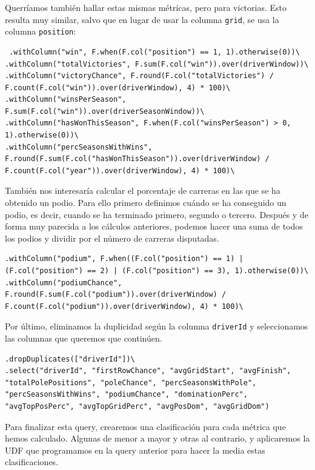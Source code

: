 \documentclass[12pt,twoside,titlepage]{report}
\begin{document}
Querríamos también hallar estas mismas métricas, pero para victorias. Esto resulta muy similar, salvo que en lugar de usar la columna \texttt{grid}, se usa la columna \texttt{position}:

\begin{lstlisting}
 .withColumn("win", F.when(F.col("position") == 1, 1).otherwise(0))\
.withColumn("totalVictories", F.sum(F.col("win")).over(driverWindow))\
.withColumn("victoryChance", F.round(F.col("totalVictories") / F.count(F.col("win")).over(driverWindow), 4) * 100)\
.withColumn("winsPerSeason", F.sum(F.col("win")).over(driverSeasonWindow))\
.withColumn("hasWonThisSeason", F.when(F.col("winsPerSeason") > 0, 1).otherwise(0))\
.withColumn("percSeasonsWithWins", F.round(F.sum(F.col("hasWonThisSeason")).over(driverWindow) / F.count(F.col("year")).over(driverWindow), 4) * 100)\
\end{lstlisting}

También nos interesaría calcular el porcentaje de carreras en las que se ha obtenido un podio. Para ello primero definimos cuándo se ha conseguido un podio, es decir, cuando se ha terminado primero, segundo o tercero. Después y de forma muy parecida a los cálculos anteriores, podemos hacer una suma de todos los podios y dividir por el número de carreras disputadas.

\begin{lstlisting}
.withColumn("podium", F.when((F.col("position") == 1) | (F.col("position") == 2) | (F.col("position") == 3), 1).otherwise(0))\
.withColumn("podiumChance", F.round(F.sum(F.col("podium")).over(driverWindow) / F.count(F.col("podium")).over(driverWindow), 4) * 100)\
\end{lstlisting}

Por último, eliminamos la duplicidad según la columna \texttt{driverId} y seleccionamos las columnas que queremos que continúen.

\begin{lstlisting}
.dropDuplicates(["driverId"])\
.select("driverId", "firstRowChance", "avgGridStart", "avgFinish", 
"totalPolePositions", "poleChance", "percSeasonsWithPole", 
"percSeasonsWithWins", "podiumChance", "dominationPerc", 
"avgTopPosPerc", "avgTopGridPerc", "avgPosDom", "avgGridDom")
\end{lstlisting}

Para finalizar esta query, crearemos una clasificación para cada métrica que hemos calculado. Algunas de menor a mayor y otras al contrario, y aplicaremos la UDF que programamos en la query anterior para hacer la media estas clasificaciones.
\end{document}
